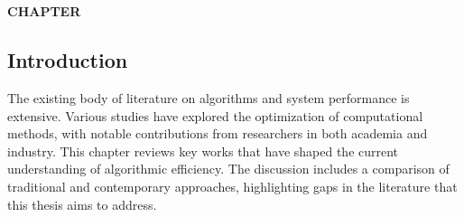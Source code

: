 \chapter*{}  %

\setcounter{chapter}{2}  %
\setcounter{section}{0}  %
\setcounter{subsection}{0}  %
\setcounter{subsubsection}{0}  %

\vspace*{-50mm}


\vspace*{10mm}  %

\begin{center}
    \textbf{CHAPTER \thechapter}\\
    \vspace{5mm}  %
    \textbf{\chapterTWOtopic}
\end{center}

\vspace{10mm}  %

\section{Introduction}

\setlength{\parindent}{1cm}  %

\begin{spacing}{2}  %

The existing body of literature on algorithms and system performance is extensive. Various studies have explored the optimization of computational methods, with notable contributions from researchers in both academia and industry. This chapter reviews key works that have shaped the current understanding of algorithmic efficiency. The discussion includes a comparison of traditional and contemporary approaches, highlighting gaps in the literature that this thesis aims to address.

\end{spacing}
